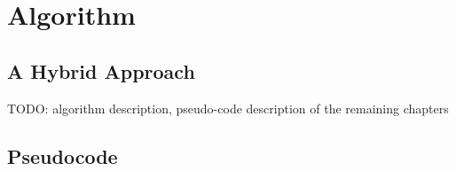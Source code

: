 
\chapter{Algorithm}
\label{Algorithm}

\section{A Hybrid Approach}
TODO: algorithm description, pseudo-code
description of the remaining chapters

\section{Pseudocode}